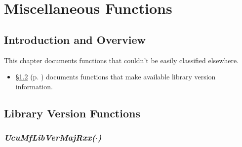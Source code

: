 
\chapter{Miscellaneous Functions}        
\label{cmsc0}

\section{Introduction and Overview}
\label{cmsc0:siov0}

This chapter documents functions that couldn't be easily classified elsewhere.

\begin{itemize}
\item \S{}\ref{cmsc0:slfv0} (p. \pageref{cmsc0:slfv0}) documents functions that
      make available library version information. 
\end{itemize}

\section{Library Version Functions}
\label{cmsc0:slfv0}



\subsection[\emph{UcuMfLibVerMajRxx(\protect\mbox{\protect$\cdot$})}]
           {\emph{UcuMfLibVerMajRxx(\protect\mbox{\protect\boldmath $\cdot$})}}
\label{cmsc0:slvf0}

%

